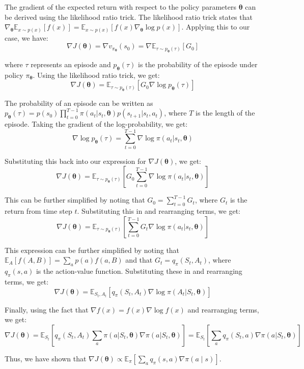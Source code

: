 \documentclass{homework}
\begin{document}
The gradient of the expected return with respect to the policy parameters $\boldsymbol{\theta}$ can be derived using the likelihood ratio trick. The likelihood ratio trick states that $\nabla_{\boldsymbol{\theta}} \mathbb{E}_{x \sim p(x)}[f(x)] = \mathbb{E}_{x \sim p(x)}[f(x) \nabla_{\boldsymbol{\theta}} \log p(x)]$. Applying this to our case, we have:
$$
\nabla J(\boldsymbol{\theta}) = \nabla v_{\pi_{\boldsymbol{\theta}}}(s_0) = \nabla \mathbb{E}_{\tau \sim p_{\boldsymbol{\theta}}(\tau)}[G_0]
$$

where $\tau$ represents an episode and $p_{\boldsymbol{\theta}}(\tau)$ is the probability of the episode under policy $\pi_{\boldsymbol{\theta}}$. Using the likelihood ratio trick, we get:
$$
\nabla J(\boldsymbol{\theta}) = \mathbb{E}_{\tau \sim p_{\boldsymbol{\theta}}(\tau)}[G_0 \nabla \log p_{\boldsymbol{\theta}}(\tau)]
$$

The probability of an episode can be written as $p_{\boldsymbol{\theta}}(\tau) = p(s_0) \prod_{t=0}^{T-1} \pi(a_t|s_t,\boldsymbol{\theta})p(s_{t+1}|s_t,a_t)$, where $T$ is the length of the episode. Taking the gradient of the log-probability, we get:
$$
\nabla \log p_{\boldsymbol{\theta}}(\tau) = \sum_{t=0}^{T-1} \nabla \log \pi(a_t|s_t,\boldsymbol{\theta})
$$

Substituting this back into our expression for $\nabla J(\boldsymbol{\theta})$, we get:
$$
\nabla J(\boldsymbol{\theta}) = \mathbb{E}_{\tau \sim p_{\boldsymbol{\theta}}(\tau)}[G_0 \sum_{t=0}^{T-1} \nabla \log \pi(a_t|s_t,\boldsymbol{\theta})]
$$

This can be further simplified by noting that $G_0 = \sum_{t=0}^{T-1} G_t$, where $G_t$ is the return from time step $t$. Substituting this in and rearranging terms, we get:
$$
\nabla J(\boldsymbol{\theta}) = \mathbb{E}_{\tau \sim p_{\boldsymbol{\theta}}(\tau)}[\sum_{t=0}^{T-1} G_t \nabla \log \pi(a_t|s_t,\boldsymbol{\theta})]
$$

This expression can be further simplified by noting that $\mathbb{E}_{A}[f(A,B)] = \sum_a p(a) f(a,B)$ and that $G_t = q_{\pi}(S_t,A_t)$, where $q_{\pi}(s,a)$ is the action-value function. Substituting these in and rearranging terms, we get:
$$
\nabla J(\boldsymbol{\theta}) = \mathbb{E}_{S_t,A_t}[q_{\pi}(S_t,A_t) \nabla \log \pi(A_t|S_t,\boldsymbol{\theta})]
$$

Finally, using the fact that $\nabla f(x) = f(x) \nabla \log f(x)$ and rearranging terms, we get:
$$
\nabla J(\boldsymbol{\theta}) =  \mathbb{E}_{S_t}[q_{\pi}(S_t,A_t)  {\sum_a  {\pi(a|S_t,\boldsymbol{\theta})  {\nabla  {\pi(a|S_t,\boldsymbol{\theta}) }}}}]=  {\mathbb{E}_{S_t}  [{\sum_a  {q_{\pi}(S_t,a)  {\nabla  {\pi(a|S_t,\boldsymbol{\theta}) }}}}] }
$$

Thus, we have shown that $\nabla J(\boldsymbol{\theta}) \propto \mathbb{E}_{\pi}\left[\sum_{a} q_{\pi}(s, a) \nabla \pi(a \mid s)\right]$.

~



\end{document}
